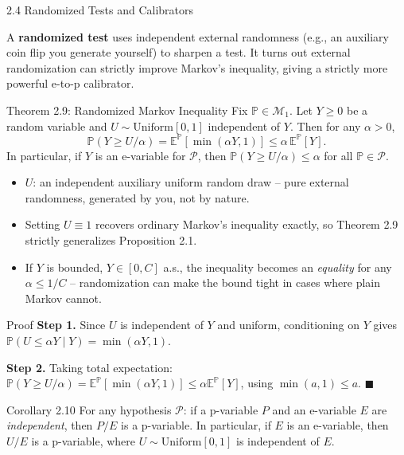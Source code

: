 \documentclass[aspectratio=169,10pt]{beamer}
\newcommand{\PP}{\mathbb{P}}
\newcommand{\EE}{\mathbb{E}}
\newcommand{\calP}{\mathcal{P}}
\begin{document}
\begin{frame}[allowframebreaks]{2.4 Randomized Tests and Calibrators}

A \textbf{randomized test} uses independent external randomness (e.g., an
auxiliary coin flip you generate yourself) to sharpen a test. It turns out
external randomization can strictly improve Markov's inequality, giving a
strictly more powerful e-to-p calibrator.

  \begin{block}{Theorem 2.9: Randomized Markov Inequality}
    Fix $\PP\in\mathcal{M}_1$. Let $Y\ge0$ be a random variable and
    $U\sim \mathrm{Uniform}[0,1]$ independent of $Y$. Then for any $\alpha>0$,
    \[
      \PP(Y \ge U/\alpha) = \EE^\PP[\min(\alpha Y,1)] \le \alpha\,\EE^\PP[Y].
    \]
    In particular, if $Y$ is an e-variable for $\calP$, then
    $\PP(Y\ge U/\alpha)\le\alpha$ for all $\PP\in\calP$.
  \end{block}

  \begin{itemize}
    \item $U$: an independent auxiliary uniform random draw -- pure
      external randomness, generated by you, not by nature.
    \item Setting $U\equiv1$ recovers ordinary Markov's inequality
      exactly, so Theorem 2.9 strictly generalizes Proposition 2.1.
    \item If $Y$ is bounded, $Y\in[0,C]$ a.s., the inequality becomes an
      \emph{equality} for any $\alpha\le1/C$ -- randomization can make the
      bound tight in cases where plain Markov cannot.
    \end{itemize}

  \begin{block}{Proof}
    \textbf{Step 1.} Since $U$ is independent of $Y$ and uniform,
    conditioning on $Y$ gives $\PP(U\le \alpha Y \mid Y) = \min(\alpha Y,1)$.

    \medskip
    \textbf{Step 2.} Taking total expectation:
    $\PP(Y\ge U/\alpha) = \EE^\PP[\min(\alpha Y,1)] \le \alpha \EE^\PP[Y]$,
    using $\min(a,1)\le a$. $\blacksquare$
  \end{block}

  \framebreak

  \begin{block}{Corollary 2.10}
    For any hypothesis $\calP$: if a p-variable $P$ and an e-variable $E$
    are \emph{independent}, then $P/E$ is a p-variable. In particular, if
    $E$ is an e-variable, then $U/E$ is a p-variable, where
    $U\sim\mathrm{Uniform}[0,1]$ is independent of $E$.
  \end{block}


\end{frame}
\end{document}
